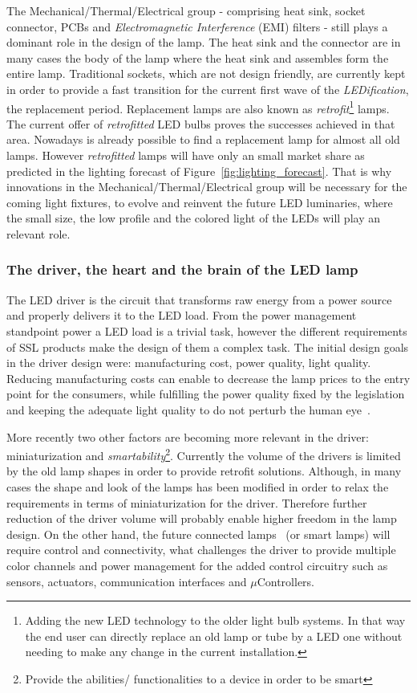 The Mechanical/Thermal/Electrical group - comprising heat sink, socket connector, PCBs and \emph{Electromagnetic Interference} (EMI) filters - still plays a dominant role in the design of the lamp. The heat sink and the connector are in many cases the body of the lamp where the heat sink and assembles form the entire lamp. Traditional sockets, which are not design friendly, are currently kept in order to provide a fast transition for the current first wave of the \emph{LEDification}, the replacement period. Replacement lamps are also known as \emph{retrofit}\footnote{Adding the new LED technology to the older light bulb systems. In that way the end user can directly replace an old lamp or tube by a LED one without needing to make any change in the current installation.} lamps. The current offer of \emph{retrofitted} LED bulbs proves the successes achieved in that area. Nowadays is already possible to find a replacement lamp for almost all old lamps. However \emph{retrofitted} lamps will have only an small market share as predicted in the lighting forecast of Figure~\ref{fig:lighting_forecast}. That is why innovations in the Mechanical/Thermal/Electrical group will be necessary for the coming light fixtures, to evolve and reinvent the future LED luminaries, where the small size, the low profile and the colored light of the LEDs will play an relevant role.

\subsubsection{The driver, the heart and the brain of the LED lamp}
The LED driver is the circuit that transforms raw energy from a power source and properly delivers it to the LED load. From the power management standpoint power a LED load is a trivial task, however the different requirements of SSL products make the design of them a complex task. The initial design goals in the driver design were: manufacturing cost, power quality, light quality. Reducing manufacturing costs can enable to decrease the lamp prices to the entry point for the consumers, while fulfilling the power quality fixed by the legislation and keeping the adequate light quality to do not perturb the human eye~\cite{10Wilkins}.

More recently two other factors are becoming more relevant in the driver: miniaturization and \emph{smartability}\footnote{Provide the abilities/ functionalities to a device in order to be smart}. Currently the volume of the drivers is limited by the old lamp shapes in order to provide retrofit solutions. Although, in many cases the shape and look of the lamps has been modified in order to relax the requirements in terms of miniaturization for the driver. Therefore further reduction of the driver volume will probably enable higher freedom in the lamp design. On the other hand, the future connected lamps~\cite{14Harbers} (or smart lamps) will require control and connectivity, what challenges the driver to provide multiple color channels and power management for the added control circuitry such as sensors, actuators, communication interfaces and $\mu$Controllers.

